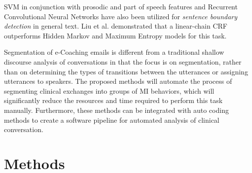 \documentclass{amia}
\begin{document}
SVM in conjunction with prosodic and part of speech features \cite{kreuzthaler2015detection} and Recurrent Convolutional Neural Networks \cite{griffis2016quantitative} have also been utilized for \textit{sentence boundary detection} in general text. Liu et al. \cite{liu2005using} demonstrated that a linear-chain CRF outperforms Hidden Markov and Maximum Entropy models for this task. 

Segmentation of e-Coaching emails is different from a traditional shallow discourse analysis of conversations \cite{galley2003discourse} in that the focus is on segmentation, rather than on determining the types of transitions between the utterances or assigning utterances to speakers. The proposed methods will automate the process of segmenting clinical exchanges into groups of MI behaviors, which will significantly reduce the resources and time required to perform this task manually. Furthermore, these methods can be integrated with auto coding methods \cite{hasan2016study,kotov2015interpretable} to create a software pipeline for automated analysis of clinical conversation.
  
\section*{Methods}
\end{document}
